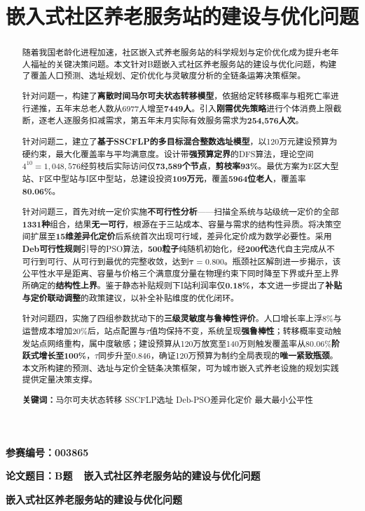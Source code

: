 \documentclass[zihao=-4]{cumcmthesis}
\title{嵌入式社区养老服务站的建设与优化问题}
\begin{document}
\begin{center}
\vspace*{4cm}
{\textbf{参赛编号：003865}}

\vspace{2cm}

{\textbf{论文题目：B题~~嵌入式社区养老服务站的建设与优化问题}}
\end{center}
\newpage
{}

\begin{center}
{\textbf{嵌入式社区养老服务站的建设与优化问题}}
\end{center}
\vspace{0.5cm}

\begin{abstract}
随着我国老龄化进程加速，社区嵌入式养老服务站的科学规划与定价优化成为提升老年人福祉的关键决策问题。本文针对B题嵌入式社区养老服务站的建设与优化问题，构建了覆盖人口预测、选址规划、定价优化与灵敏度分析的全链条运筹决策框架。

针对问题一，构建了\textbf{离散时间马尔可夫状态转移模型}，依据给定转移概率与粗死亡率进行递推，五年末总老人数从6977人增至\textbf{7449人}。引入\textbf{刚需优先策略}进行个体消费上限截断，逐老人逐服务扣减需求，第五年末月实际有效服务需求为\textbf{254,576人次}。

针对问题二，建立了\textbf{基于SSCFLP的多目标混合整数选址模型}，以120万元建设预算为硬约束，最大化覆盖率与平均满意度。设计带\textbf{强预算定界}的DFS算法，理论空间$4^{10}=1{,}048{,}576$经剪枝后实际访问仅\textbf{73,589个节点}，\textbf{剪枝率93\%}。最优方案为E区大型站、F区中型站与I区中型站，总建设投资\textbf{109万元}，覆盖\textbf{5964位老人}，覆盖率\textbf{80.06\%}。

针对问题三，首先对统一定价实施\textbf{不可行性分析}——扫描全系统与站级统一定价的全部\textbf{1331种}组合，结果\textbf{无一可行}，根源在于三站成本、容量与需求的结构性异质。将决策空间扩展至\textbf{15维差异化定价}后系统首次出现可行域，差异化定价成为数学必要性。采用\textbf{Deb可行性规则}引导的PSO算法，\textbf{500粒子}纯随机初始化，经\textbf{200代}迭代自主完成从不可行到可行、从可行到最优的完整收敛，达到\textbf{$\boldsymbol{\tau}=\mathbf{0.800}$}。瓶颈社区解剖进一步揭示，该公平性水平是距离、容量与价格三个满意度分量在物理约束下同时降至下界或升至上界所确定的\textbf{结构性上界}。鉴于静态补贴规则下I站利润率仅\textbf{0.18\%}，本文进一步提出了\textbf{补贴与定价联动调整}的政策建议，以补全补贴维度的优化闭环。

针对问题四，实施了四组参数扰动下的\textbf{三级灵敏度与鲁棒性评价}。人口增长率上浮8\%与运营成本增加20\%后，站点配置与$\tau$值均保持不变，系统呈现\textbf{强鲁棒性}；转移概率变动触发站点网络重构，属中度敏感；建设预算从120万放宽至140万则触发覆盖率从80.06\%\textbf{阶跃式增长至100\%}，$\tau$同步升至$\mathbf{0.846}$，确证120万预算为制约全局表现的\textbf{唯一紧致瓶颈}。本文所构建的预测、选址与定价全链条决策框架，可为城市嵌入式养老设施的规划实践提供定量决策支撑。

\textbf{关键词：}马尔可夫状态转移 \quad SSCFLP选址 \quad Deb-PSO差异化定价 \quad 最大最小公平性
\end{abstract}
\end{document}
